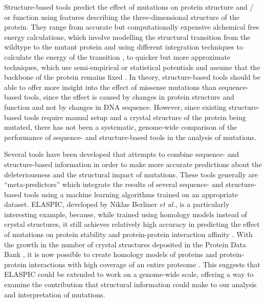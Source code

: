 Structure-based tools predict the effect of mutations on protein structure and / or function using features describing the three-dimensional structure of the protein. They range from accurate but computationally expensive alchemical free energy calculations, which involve modelling the structural transition from the wildtype to the mutant protein and using different integration techniques to calculate the energy of the transition \cite{monticelli_introduction_2013}, to quicker but more approximate techniques, which use semi-empirical or statistical potentials and assume that the backbone of the protein remains fixed \cite{benedix_predicting_2009,pires_mcsm:_2014,laimer_maestro_2015,petukh_predicting_2015}. In theory, structure-based tools should be able to offer more insight into the effect of missense mutations than sequence-based tools, since the effect is caused by changes in protein structure and function and not by changes in DNA sequence. However, since existing structure-based tools require manual setup and a crystal structure of the protein being mutated, there has not been a systematic, genome-wide comparison of the performance of sequence- and structure-based tools in the analysis of mutations.

Several tools have been developed that attempts to combine sequence- and structure-based information in order to make more accurate predictions about the deleteriousness \cite{baugh_robust_2016} and the structural impact \cite{dehouck_fast_2009,berliner_combining_2014,li_mutabind_2016} of mutations. These tools generally are ``meta-predictors'' which integrate the results of several sequence- and structure-based tools using a machine learning algorithms trained on an appropriate dataset. ELASPIC, developed by Niklas Berliner \textit{et al.}, is a particularly interesting example, because, while trained using homology models instead of crystal structures, it still achieves relatively high accuracy in predicting the effect of mutations on protein stability and protein-protein interaction affinity \cite{berliner_combining_2014}. With the growth in the number of crystal structures deposited in the Protein Data Bank \cite{berman_protein_2000}, it is now possible to create homology models of proteins and protein-protein interactions with high coverage of an entire proteome \cite{mosca_interactome3d:_2013}. This suggests that ELASPIC could be extended to work on a genome-wide scale, offering a way to examine the contribution that structural information could make to our analysis and interpretation of mutations.


